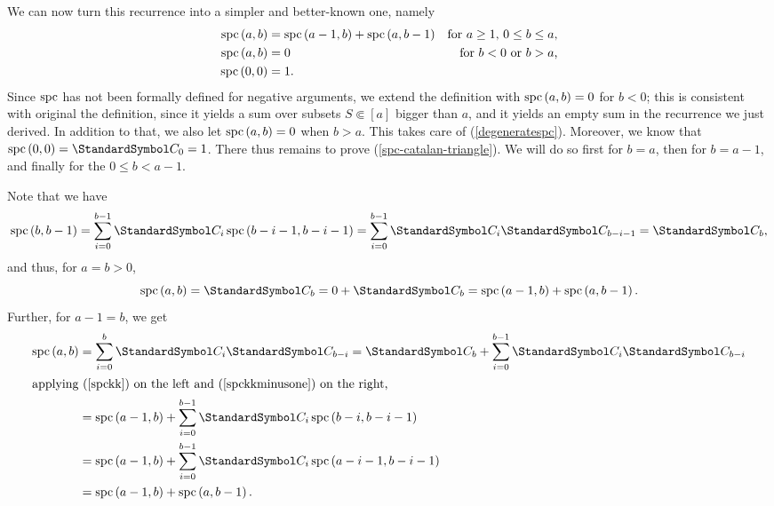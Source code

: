 We can now turn this recurrence into a simpler and better-known one, namely
\begin{align}
\operatorname{spc}\left(a,b\right) &= \operatorname{spc}\left(a-1, b\right) + \operatorname{spc}\left(a,b-1\right) & \text{for $a\geq 1$, $0\leq b \leq a$,}\label{spc-catalan-triangle}\\
\operatorname{spc}\left(a,b\right) &= 0 & \text{for $b < 0$ or $b > a$,}\label{degeneratespc}\\
\operatorname{spc}\left(0,0\right) &= 1 \label{spc00}\text.
\end{align}
Since $\operatorname{spc}$ has not been formally defined for negative arguments, we extend the definition
with $\operatorname{spc}\left(a,b\right)=0$ for $b<0$; this is consistent with original the definition, since it yields a sum over
subsets $S\Subset [a]$ bigger than $a$, and it yields an empty sum in the recurrence we just derived.
In addition to that, we also let $\operatorname{spc}\left(a,b\right) = 0$ when $b > a$. This takes care of (\ref{degeneratespc}).
Moreover, we know that $\spc\of{0,0}=\CatalanNumber 0=1$. There thus remains to prove (\ref{spc-catalan-triangle}).
We will do so first for $b=a$, then for $b=a-1$, and finally for the $0\leq b < a-1$.

Note that we have\begin{align}
\spc\of{b, b-1}
= \sum{i=0}[b-1]\CatalanNumber {i}\spc\of{b-i-1,b-i-1} 
= \sum{i=0}[b-1]\CatalanNumber {i}\CatalanNumber {b-i-1}
= \CatalanNumber {b}\text,\label{spckkminusone}
\end{align}
and thus, for $a=b > 0$,
\begin{equation}
\spc\of{a,b} = \CatalanNumber b = 0 + \CatalanNumber b = \spc\of{a-1, b} + \spc\of{a, b-1}.
\end{equation}
Further, for $a - 1 = b$, we get
\begin{align}
\spc\of{a,b}
&= \sum{i=0}[b]\CatalanNumber {i}\CatalanNumber {b-i} =
\CatalanNumber b + \sum{i=0}[b-1]\CatalanNumber{i}\CatalanNumber {b-i} \nonumber\\
\intertext{applying (\ref{spckk}) on the left and (\ref{spckkminusone}) on the right,}
&= \spc\of{a-1, b} + \sum{i=0}[b-1]\CatalanNumber {i}\spc\of{b-i,b-i-1} \nonumber\\
&= \spc\of{a-1, b} + \sum{i=0}[b-1]\CatalanNumber {i}\spc\of{a-i-1,b-i-1} \nonumber\\
&= \spc\of{a-1, b} + \spc\of{a,b-1}\text.
\end{align}

